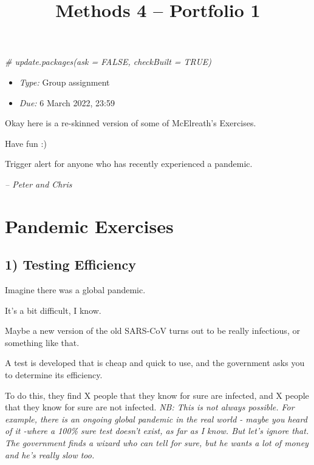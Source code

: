 \documentclass[
]{article}
\title{Methods 4 -- Portfolio 1}
\author{}
\date{\vspace{-2.5em}}
\newenvironment{Shaded}{\begin{snugshade}}{\end{snugshade}}
\newcommand{\CommentTok}[1]{\textcolor[rgb]{0.56,0.35,0.01}{\textit{#1}}}
\providecommand{\tightlist}{%
  \setlength{\itemsep}{0pt}\setlength{\parskip}{0pt}}
\begin{document}
\maketitle

\begin{Shaded}
\begin{Highlighting}[]
\CommentTok{\# update.packages(ask = FALSE, checkBuilt = TRUE)}
\end{Highlighting}
\end{Shaded}

\begin{itemize}
\tightlist
\item
  \emph{Type:} Group assignment
\item
  \emph{Due:} 6 March 2022, 23:59
\end{itemize}

Okay here is a re-skinned version of some of McElreath's Exercises.

Have fun :)

Trigger alert for anyone who has recently experienced a pandemic.

\emph{-- Peter and Chris}

\hypertarget{pandemic-exercises}{%
\section{Pandemic Exercises}\label{pandemic-exercises}}

\hypertarget{testing-efficiency}{%
\subsection{1) Testing Efficiency}\label{testing-efficiency}}

Imagine there was a global pandemic.

It's a bit difficult, I know.

Maybe a new version of the old SARS-CoV turns out to be really
infectious, or something like that.

A test is developed that is cheap and quick to use, and the government
asks you to determine its efficiency.

To do this, they find X people that they know for sure are infected, and
X people that they know for sure are not infected. \emph{NB: This is not
always possible. For example, there is an ongoing global pandemic in the
real world - maybe you heard of it -where a 100\% sure test doesn't
exist, as far as I know. But let's ignore that. The government finds a
wizard who can tell for sure, but he wants a lot of money and he's
really slow too.}
\end{document}
